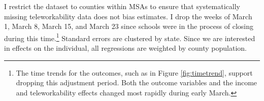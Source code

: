     I restrict the dataset to counties within MSAs to ensure that systematically missing teleworkability data does not bias estimates.
    I drop the weeks of March 1, March 8, March 15, and March 23 since schools were in the process of closing during this time.\footnote{The time trends for the outcomes, such as in Figure \ref{fig:timetrend}, support dropping this adjustment period. Both the outcome variables and the income and teleworkability effects changed most rapidly during early March.}
Standard errors are clustered by state.
Since we are interested in effects on the individual, all regressions are weighted by county population.
